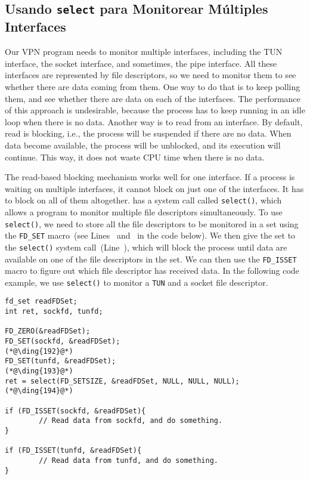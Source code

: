 \subsection{Usando \texttt{select} para Monitorear Múltiples Interfaces}
\label{vpn:subsec:select}

Our VPN program needs to monitor multiple interfaces, including the TUN interface, the socket
interface, and sometimes, the pipe interface.   
All these interfaces are represented by file descriptors, so we need to 
monitor them to see whether there are data coming from them. 
One way to do that is to keep polling them, and
see whether there are data on each of the interfaces. The performance of this approach is
undesirable, because the process has to keep running in an idle loop when there is no data.
Another way is to read from an interface.  By default, read is blocking, i.e., the process will
be suspended if there are no data. When data become available, the process will be unblocked,
and its execution will continue. This way, it does not waste CPU time when there is no data.

The read-based blocking mechanism works well for one interface. If a process is waiting on
multiple interfaces, it cannot block on just one of the interfaces. It has to block on all of
them altogether.  \linux has a system call called \texttt{select()}, which
allows a program to monitor multiple file descriptors simultaneously.
To use \texttt{select()}, we need to store all the file descriptors to be monitored in a set
using the \texttt{FD\_SET} macro~(see Lines~ and~ in
the code below).  We then give the set to the \texttt{select()} system
call~(Line~), which will block the process until data are available on one of the
file descriptors in the set.  We can then use the \texttt{FD\_ISSET} macro to figure out which
file descriptor has received data. In the following code example, 
we use \texttt{select()} to monitor a \texttt{TUN} and a socket file
descriptor.


\begin{lstlisting}
fd_set readFDSet;
int ret, sockfd, tunfd;

FD_ZERO(&readFDSet);
FD_SET(sockfd, &readFDSet);                                (*@\ding{192}@*)
FD_SET(tunfd, &readFDSet);                                 (*@\ding{193}@*)
ret = select(FD_SETSIZE, &readFDSet, NULL, NULL, NULL);    (*@\ding{194}@*)

if (FD_ISSET(sockfd, &readFDSet){
        // Read data from sockfd, and do something.
}

if (FD_ISSET(tunfd, &readFDSet){
        // Read data from tunfd, and do something. 
}
\end{lstlisting}



